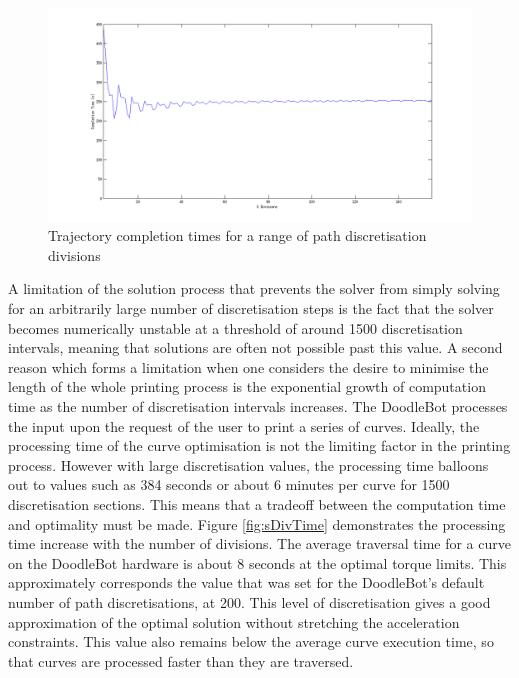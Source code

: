 \begin{figure}[htbp]  
\includegraphics[width=\textwidth]{figures/performance/sDivisions.png}
\caption[Trajectory completion time for a range of path discretisation divisions]{Trajectory completion times for a range of path discretisation divisions
\label{fig:sDivisions}}
\end{figure} 

A limitation of the solution process that prevents the solver from simply solving for an arbitrarily large number of discretisation steps is the fact that the solver becomes numerically unstable at a threshold of around 1500 discretisation intervals, meaning that solutions are often not possible past this value. A second reason which forms a limitation when one considers the desire to minimise the length of the whole printing process is the exponential growth of computation time as the number of discretisation intervals increases. The DoodleBot processes the input upon the request of the user to print a series of curves. Ideally, the processing time of the curve optimisation is not the limiting factor in the printing process. However with large discretisation values, the processing time balloons out to values such as 384 seconds or about 6 minutes per curve for 1500 discretisation sections. This means that a tradeoff between the computation time and optimality must be made. Figure \ref{fig:sDivTime} demonstrates the processing time increase with the number of divisions. The average traversal time for a curve on the DoodleBot hardware is about 8 seconds at the optimal torque limits. This approximately corresponds the value that was set for the DoodleBot's default number of path discretisations, at 200. This level of discretisation gives a good approximation of the optimal solution without stretching the acceleration constraints. This value also remains below the average curve execution time, so that curves are processed faster than they are traversed.


